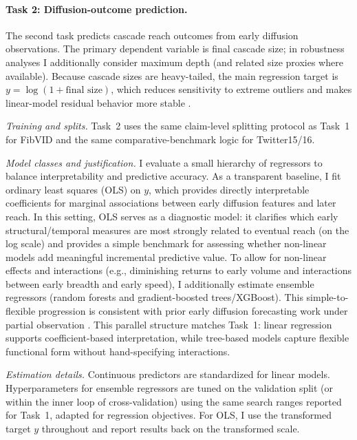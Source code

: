 \paragraph{Task 2: Diffusion-outcome prediction.}
The second task predicts cascade reach outcomes from early diffusion observations. The primary dependent variable is final cascade size; in robustness analyses I additionally consider maximum depth (and related size proxies where available). Because cascade sizes are heavy-tailed, the main regression target is $y=\log(1+\text{final size})$, which reduces sensitivity to extreme outliers and makes linear-model residual behavior more stable \citep{szabo_predicting_2010,cheng_can_2014}.

\emph{Training and splits.} Task~2 uses the same claim-level splitting protocol as Task~1 for FibVID and the same comparative-benchmark logic for Twitter15/16.

\emph{Model classes and justification.} I evaluate a small hierarchy of regressors to balance interpretability and predictive accuracy. As a transparent baseline, I fit ordinary least squares (OLS) on $y$, which provides directly interpretable coefficients for marginal associations between early diffusion features and later reach. In this setting, OLS serves as a diagnostic model: it clarifies which early structural/temporal measures are most strongly related to eventual reach (on the log scale) and provides a simple benchmark for assessing whether non-linear models add meaningful incremental predictive value. To allow for non-linear effects and interactions (e.g., diminishing returns to early volume and interactions between early breadth and early speed), I additionally estimate ensemble regressors (random forests and gradient-boosted trees/XGBoost). This simple-to-flexible progression is consistent with prior early diffusion forecasting work under partial observation \citep{szabo_predicting_2010,cheng_can_2014}. This parallel structure matches Task~1: linear regression supports coefficient-based interpretation, while tree-based models capture flexible functional form without hand-specifying interactions.

\emph{Estimation details.} Continuous predictors are standardized for linear models. Hyperparameters for ensemble regressors are tuned on the validation split (or within the inner loop of cross-validation) using the same search ranges reported for Task~1, adapted for regression objectives. For OLS, I use the transformed target $y$ throughout and report results back on the transformed scale.

